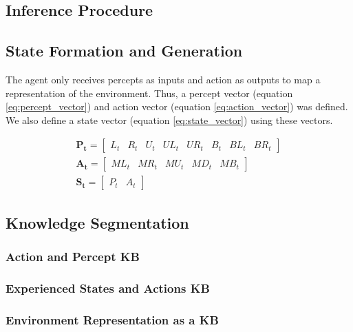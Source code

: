 \subsection{Inference Procedure}
\subsection{State Formation and Generation}

The agent only receives percepts as inputs and action as outputs to map a representation of the environment. Thus, a percept vector (equation \ref{eq:percept_vector}) and action vector (equation \ref{eq:action_vector}) was defined. We also define a state vector (equation \ref{eq:state_vector}) using these vectors.

\begin{subequations}
\begin{align}
    \mathbf{P_t}=
\begin{bmatrix}
L_t & R_t & U_t & UL_t & UR_t & B_t & BL_t & BR_t
\end{bmatrix} 
 \label{eq:percept_vector}\\
\mathbf{A_t}=
\begin{bmatrix}
ML_t & MR_t & MU_t & MD_t & MB_t 
\end{bmatrix} 
 \label{eq:action_vector}\\
       \mathbf{S_t}=
\begin{bmatrix}
P_t & A_t  
\end{bmatrix}
 \label{eq:state_vector}
\end{align}
\end{subequations}

\subsection{Knowledge Segmentation}

\subsubsection{Action and Percept KB}

\subsubsection{Experienced States and Actions KB}


\subsubsection{Environment Representation as a KB}


